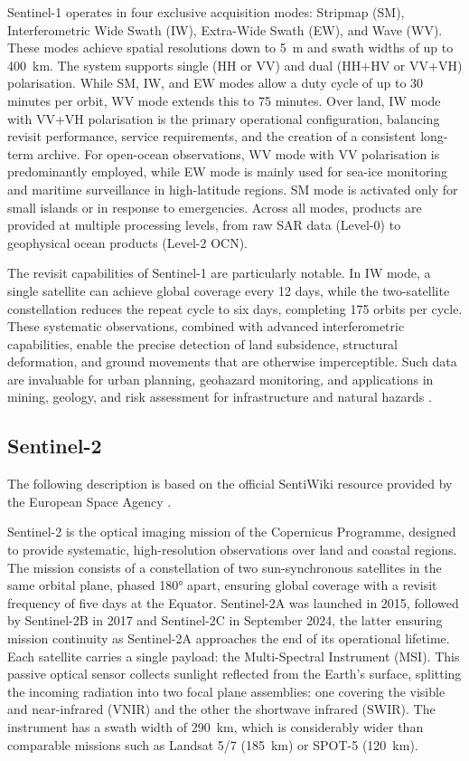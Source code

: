 Sentinel-1 operates in four exclusive acquisition modes: Stripmap (SM), Interferometric Wide Swath (IW), Extra-Wide Swath (EW), and Wave (WV). These modes achieve spatial resolutions down to 5~m and swath widths of up to 400~km. The system supports single (HH or VV) and dual (HH+HV or VV+VH) polarisation. While SM, IW, and EW modes allow a duty cycle of up to 30 minutes per orbit, WV mode extends this to 75 minutes. Over land, IW mode with VV+VH polarisation is the primary operational configuration, balancing revisit performance, service requirements, and the creation of a consistent long-term archive. For open-ocean observations, WV mode with VV polarisation is predominantly employed, while EW mode is mainly used for sea-ice monitoring and maritime surveillance in high-latitude regions. SM mode is activated only for small islands or in response to emergencies. Across all modes, products are provided at multiple processing levels, from raw SAR data (Level-0) to geophysical ocean products (Level-2 OCN).  

The revisit capabilities of Sentinel-1 are particularly notable. In IW mode, a single satellite can achieve global coverage every 12 days, while the two-satellite constellation reduces the repeat cycle to six days, completing 175 orbits per cycle. These systematic observations, combined with advanced interferometric capabilities, enable the precise detection of land subsidence, structural deformation, and ground movements that are otherwise imperceptible. Such data are invaluable for urban planning, geohazard monitoring, and applications in mining, geology, and risk assessment for infrastructure and natural hazards \cite{sentiwiki}.  

\subsection{Sentinel-2}
The following description is based on the official SentiWiki resource provided by the European Space Agency \cite{sentiwiki}. 

Sentinel-2 is the optical imaging mission of the Copernicus Programme, designed to provide systematic, high-resolution observations over land and coastal regions. The mission consists of a constellation of two sun-synchronous satellites in the same orbital plane, phased 180° apart, ensuring global coverage with a revisit frequency of five days at the Equator. Sentinel-2A was launched in 2015, followed by Sentinel-2B in 2017 and Sentinel-2C in September 2024, the latter ensuring mission continuity as Sentinel-2A approaches the end of its operational lifetime.  
Each satellite carries a single payload: the Multi-Spectral Instrument (MSI). This passive optical sensor collects sunlight reflected from the Earth’s surface, splitting the incoming radiation into two focal plane assemblies: one covering the visible and near-infrared (VNIR) and the other the shortwave infrared (SWIR). The instrument has a swath width of 290~km, which is considerably wider than comparable missions such as Landsat 5/7 (185~km) or SPOT-5 (120~km).  

